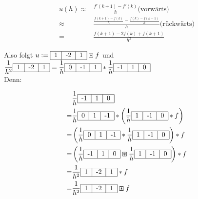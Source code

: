 
    \begin{align*}
        u(h) \approx & \frac{f'(k+1) - f'(k)}{h} \text{(vorwärts)}\\
        \approx & \frac{\frac{f(k+1) - f(k)}{h} - \frac{f(k) - f(k-1)}{h}}{h} \text{(rückwärts)} \\
        = & \frac{f(k+1) -2 f(k) + f(k+1)}{h^2}
    \end{align*}

    Also folgt $\displaystyle u:=\begin{tabular}{|c|c|c|}
        \hline
        1 & -2 & 1\\
        \hline
        \end{tabular} \boxast f$ und $\displaystyle \frac{1}{h^2}\begin{tabular}{|c|c|c|}
            \hline
            1 & -2 & 1\\
            \hline
            \end{tabular} = \frac{1}{h}\begin{tabular}{|c|c|c|}
                \hline
                0 & -1 & 1\\
                \hline
                \end{tabular} * \frac{1}{h}\begin{tabular}{|c|c|c|}
                    \hline
                    -1 & 1 & 0\\
                    \hline
                    \end{tabular}$\\
    Denn:

    \begin{align*}
         & \frac{1}{h} \filter{-1 & 1 & 0}\\
        =& \frac{1}{h} \filter{0 & 1 & -1} * \left(\frac{1}{h} \filter{1 & -1 & 0} * f\right)\\
        =& \left(\frac{1}{h} \filter{ 0 & 1 & -1} * \frac{1}{h} \filter{1 & -1 & 0}\right)*f\\
        =& \left(\frac{1}{h} \filter{ -1 & 1 & 0} \boxast \frac{1}{h} \filter{1 & -1 & 0}\right)*f\\
        =& \frac{1}{h^2} \filter{1 & -2 & 1} * f \\
        =&\frac{1}{h^2} \filter{1 & -2 & 1} \boxast f 
    \end{align*}

